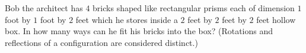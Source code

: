 Bob the architect has $4$ bricks shaped like rectangular prisms each of dimension $1$ foot by $1$ foot by $2$ feet which he stores inside a $2$ feet by $2$ feet by $2$ feet hollow box. In how many ways can he fit his bricks into the box? (Rotations and reflections of a configuration are considered distinct.)
